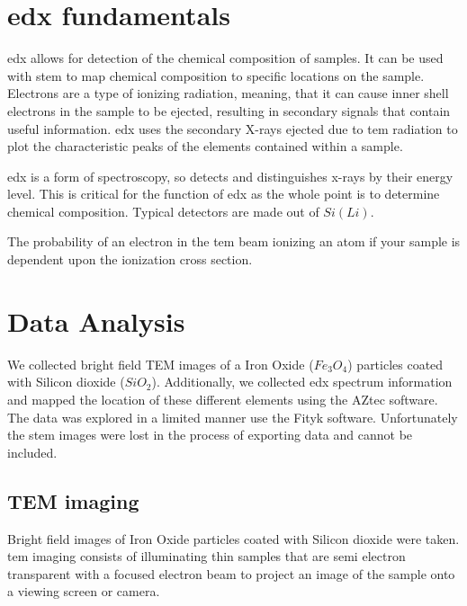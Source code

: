 \documentclass[12pt,a4paper]{article}
\begin{document}
\section{\ac{edx} fundamentals} %
\label{sec:edx}

\ac{edx} allows for detection of the chemical composition of samples.  It can be used with \ac{stem} to map chemical composition to specific locations on the sample.  Electrons are a type of ionizing radiation, meaning, that it can cause inner shell electrons in the sample to be ejected, resulting in secondary signals that contain useful information.  \ac{edx} uses the secondary X-rays ejected due to \ac{tem} radiation to plot the characteristic peaks of the elements contained within a sample.   

\ac{edx} is a form of spectroscopy, so detects and distinguishes x-rays by their energy level.  This is critical for the function of \ac{edx} as the whole point is to determine chemical composition.  Typical detectors are made out of $Si(Li)$.

The probability of an electron in the \ac{tem} beam ionizing an atom if your sample is dependent upon the ionization cross section.

\section{Data Analysis} %
\label{sec:data_analysis}

We collected bright field TEM images of a Iron Oxide ($Fe_3O_4$) particles coated with Silicon dioxide ($SiO_2$).  Additionally, we collected \ac{edx} spectrum information and mapped the location of these different elements using the AZtec software.  The data was explored in a limited manner use the Fityk software.  Unfortunately the \ac{stem} images were lost in the process of exporting data and cannot be included.

\subsection{TEM imaging} %
\label{sub:tem_imaging}

Bright field images of Iron Oxide particles coated with Silicon dioxide were taken.  \ac{tem} imaging consists of illuminating thin samples that are semi electron transparent with a focused electron beam to project an image of the sample onto a viewing screen or camera.

\lipsum[6] %
\end{document}
